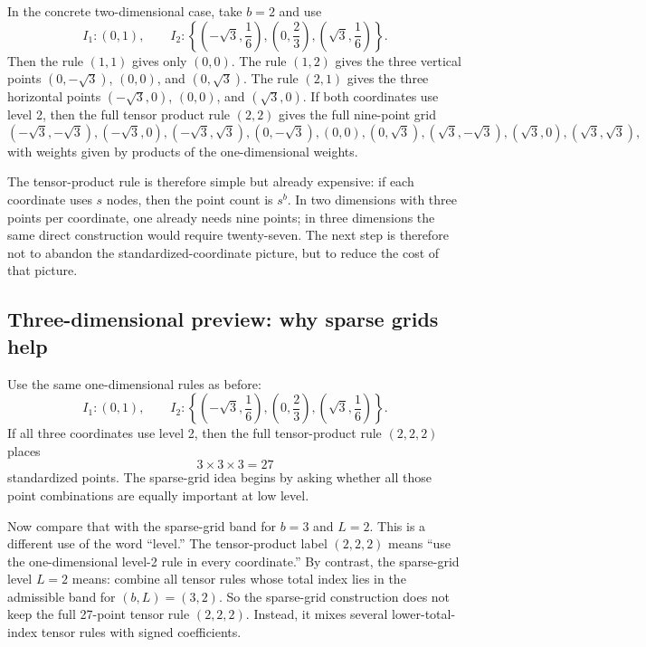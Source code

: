 \documentclass[11pt]{article}
\numberwithin{equation}{section}
\begin{document}
In the concrete two-dimensional case, take \(b=2\) and use
\begin{equation}
  I_1:(0,1),
  \qquad
  I_2:\left\{\left(-\sqrt3,\frac16\right),\left(0,\frac23\right),
  \left(\sqrt3,\frac16\right)\right\}.
  \label{eq:p36-level1-level2-rules}
\end{equation}
Then the rule \((1,1)\) gives only \((0,0)\).  The rule \((1,2)\) gives the
three vertical points \((0,-\sqrt3)\), \((0,0)\), and \((0,\sqrt3)\).  The rule
\((2,1)\) gives the three horizontal points \((-\sqrt3,0)\), \((0,0)\), and
\((\sqrt3,0)\).  If both coordinates use level 2, then the full tensor product
rule \((2,2)\) gives the full nine-point grid
\begin{equation}
  (-\sqrt3,-\sqrt3),
  (-\sqrt3,0),
  (-\sqrt3,\sqrt3),
  (0,-\sqrt3),
  (0,0),
  (0,\sqrt3),
  (\sqrt3,-\sqrt3),
  (\sqrt3,0),
  (\sqrt3,\sqrt3),
  \label{eq:p35-nine-point-grid}
\end{equation}
with weights given by products of the one-dimensional weights.

The tensor-product rule is therefore simple but already expensive: if each
coordinate uses \(s\) nodes, then the point count is \(s^b\).  In two dimensions
with three points per coordinate, one already needs nine points; in three
dimensions the same direct construction would require twenty-seven.  The next step
is therefore not to abandon the standardized-coordinate picture, but to reduce the
cost of that picture.

\subsection{Three-dimensional preview: why sparse grids help}
\label{subsec:p37-3d-preview}

Use the same one-dimensional rules as before:
\begin{equation}
  I_1:(0,1),
  \qquad
  I_2:\left\{\left(-\sqrt3,\frac16\right),\left(0,\frac23\right),
  \left(\sqrt3,\frac16\right)\right\}.
  \label{eq:p37-level1-level2-rules}
\end{equation}
If all three coordinates use level 2, then the full tensor-product rule
\((2,2,2)\) places
\begin{equation}
  3\times 3\times 3 = 27
  \label{eq:p37-27-points}
\end{equation}
standardized points.  The sparse-grid idea begins by asking whether all those
point combinations are equally important at low level.

Now compare that with the sparse-grid band for \(b=3\) and \(L=2\).  This is a
different use of the word ``level.''  The tensor-product label \((2,2,2)\)
means ``use the one-dimensional level-2 rule in every coordinate.''  By
contrast, the sparse-grid level \(L=2\) means: combine all tensor rules whose
total index lies in the admissible band for \((b,L)=(3,2)\).  So the sparse-grid
construction does not keep the full 27-point tensor rule \((2,2,2)\).  Instead,
it mixes several lower-total-index tensor rules with signed coefficients.
\end{document}
